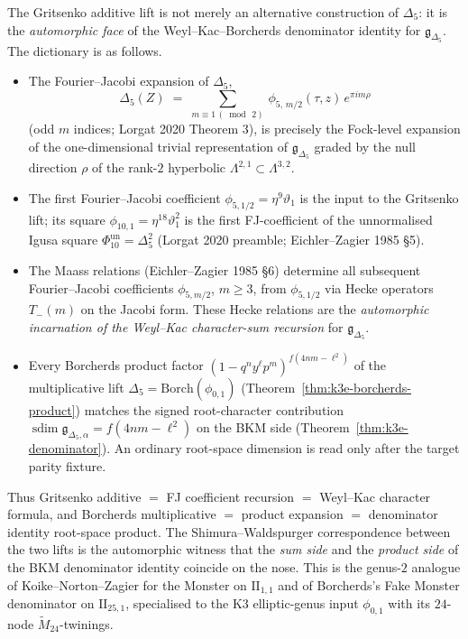 \begin{remark}
\label{rem:k3e-gritsenko-seeds-WKB}
The Gritsenko additive lift is not merely an alternative construction of $\Delta_5$:
it is the \emph{automorphic face} of the Weyl--Kac--Borcherds denominator identity
for $\mathfrak{g}_{\Delta_5}$. The dictionary is as follows.
\begin{itemize}
\item The Fourier--Jacobi expansion of $\Delta_5$,
 \[
 \Delta_5(Z)
 \;=\;
 \sum_{m\equiv 1\,(\bmod\, 2)}\, \phi_{5,\,m/2}(\tau,z)\, e^{\pi i m\rho}
 \]
 (odd $m$ indices; Lorgat 2020 Theorem $3$), is precisely the Fock-level expansion of
 the one-dimensional trivial representation of $\mathfrak{g}_{\Delta_5}$ graded by the
 null direction $\rho$ of the rank-$2$ hyperbolic $\Lambda^{2,1}\subset\Lambda^{3,2}$.
\item The first Fourier--Jacobi coefficient $\phi_{5,1/2} = \eta^9\vartheta_1$ is
 the input to the Gritsenko lift; its square $\phi_{10,1} = \eta^{18}\vartheta_1^2$
 is the first FJ-coefficient of the unnormalised Igusa square
 \(\Phi_{10}^{\mathrm{un}}=\Delta_5^2\) (Lorgat 2020 preamble;
 Eichler--Zagier 1985 \S 5).
\item The Maass relations (Eichler--Zagier 1985 \S $6$) determine all subsequent
 Fourier--Jacobi coefficients $\phi_{5,m/2}$, $m\geq 3$, from $\phi_{5,1/2}$ via
 Hecke operators $T_-(m)$ on the Jacobi form. These Hecke relations are the
 \emph{automorphic incarnation of the Weyl--Kac character-sum recursion} for
 $\mathfrak{g}_{\Delta_5}$.
	\item Every Borcherds product factor $(1 - q^n y^\ell p^m)^{f(4nm-\ell^2)}$ of the
	 multiplicative lift $\Delta_5 = \mathrm{Borch}(\phi_{0,1})$
	 (Theorem~\ref{thm:k3e-borcherds-product}) matches the signed
	 root-character contribution
	 \(\operatorname{sdim}\mathfrak g_{\Delta_5,\alpha}=f(4nm-\ell^2)\)
	 on the BKM side (Theorem~\ref{thm:k3e-denominator}). An ordinary
	 root-space dimension is read only after the target parity fixture.
\end{itemize}
Thus Gritsenko additive $=$ FJ coefficient recursion $=$ Weyl--Kac character formula,
and Borcherds multiplicative $=$ product expansion $=$ denominator identity
root-space product. The Shimura--Waldspurger correspondence between the two lifts is
the automorphic witness that the \emph{sum side} and the \emph{product side} of the
BKM denominator identity coincide on the nose. This is the genus-$2$ analogue of
Koike--Norton--Zagier for the Monster on $\mathrm{II}_{1,1}$ and of Borcherds's Fake
Monster denominator on $\mathrm{II}_{25,1}$, specialised to the K3 elliptic-genus input
$\phi_{0,1}$ with its $24$-node $\widetilde{M}_{24}$-twinings.
\end{remark}

